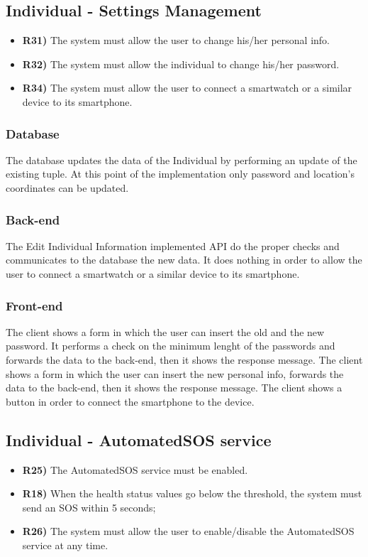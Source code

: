 \subsection{Individual - Settings Management}
\begin{itemize}	
	\item {\color{Green}\textbf{R31)}} The system must allow the user to change his/her personal info.
	\item {\color{Green}\textbf{R32)}} The system must allow the individual to change his/her password.
	\item {\color{Red}\textbf{R34)}} The system must allow the user to connect a smartwatch or a similar device to its smartphone.
\end{itemize}
\subsubsection*{Database}
The database updates the data of the Individual by performing an update of the existing tuple. At this point of the implementation only password and location's coordinates can be updated. 

\subsubsection*{Back-end}
The Edit Individual Information implemented API do the proper checks and communicates to the database the new data. It does nothing in order to allow the user to connect a smartwatch or a similar device to its smartphone.

\subsubsection*{Front-end}
The client shows a form in which the user can insert the old and the new password. It performs a check on the minimum lenght of the passwords and forwards the data to the back-end, then it shows the response message. 
The client shows a form in which the user can insert the new personal info, forwards the data to the back-end, then it shows the response message. 
The client shows a button in order to connect the smartphone to the device.


\subsection{Individual - AutomatedSOS service}
\begin{itemize}	
	\item {\color{Green}\textbf{R25)}} The AutomatedSOS service must be enabled.
	\item {\color{Green}\textbf{R18)}} When the health status values go below the threshold, the system must send an SOS within 5 seconds;
	\item {\color{Green}\textbf{R26)}} The system must allow the user to enable/disable the AutomatedSOS service at any time.
\end{itemize}

